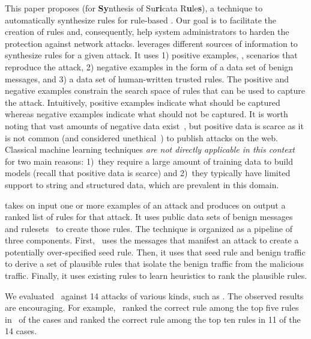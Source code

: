\documentclass[conference]{IEEEtran}
\begin{document}
\sloppy This paper proposes \tname{} (for \textbf{Sy}nthesis of
Su\textbf{ri}cata R\textbf{u}le\textbf{s}), a technique to
automatically synthesize rules for rule-based \nids. Our goal is to
facilitate the creation of rules and, consequently, help system
administrators to harden the protection against network attacks.
\tname{} leverages different sources of information to synthesize
rules for a given attack. It uses 1) positive examples, \ie{},
scenarios that reproduce the attack, 2) negative examples in the form
of a data set of benign messages, and 3) a data set of human-written
trusted rules. The positive and negative examples constrain the search
space of rules that can be used to capture the attack. Intuitively,
positive examples indicate what should be captured whereas negative
examples indicate what should not be captured. It is worth noting that
vast amounts of negative data
exist~\cite{tcpreplay,stratosphere-normal}, but positive data is
scarce as it is not common (and considered unethical~) to publish attacks on the
web. Classical machine learning techniques \emph{are not directly
  applicable in this context} for two main reasons: 1)~they require a
large amount of training data to build models (recall that positive
data is scarce) and 2)~they typically have limited support to string
and structured data, which are prevalent in this domain.


\tname{} takes on input one or more examples  of an attack and produces
on output a ranked list of rules for that attack. It uses public data
sets of benign messages~\cite{tcpreplay,stratosphere-normal} and
rulesets~\cite{emerging-threats-open} to create those rules. The
technique is organized as a pipeline of three components. First,
\tname\ uses the messages that manifest an attack to create a
potentially over-specified seed rule. Then, it uses that seed rule and
benign traffic to derive a set of plausible rules that isolate the
benign traffic from the malicious traffic. Finally, it uses existing
rules to learn heuristics to rank the plausible rules.

We evaluated \tname\ against 14 attacks of various kinds, such as . The observed results are encouraging. For 
example, \tname\ ranked the correct rule among the top five rules in 
\percTopFiveRanking\ of the cases and ranked the correct rule among 
the top ten rules in 11 of the 14 cases. 
\end{document}
